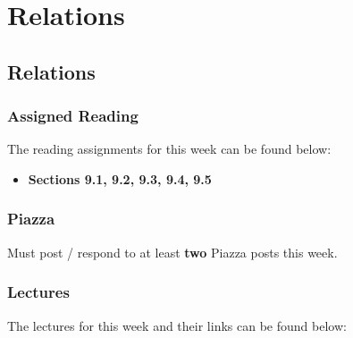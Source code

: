 \clearpage

\renewcommand{\ChapTitle}{Relations}
\renewcommand{\SectionTitle}{Relations}

\chapter{\ChapTitle}
\section{\SectionTitle}

\subsection{Assigned Reading}

The reading assignments for this week can be found below:

\begin{itemize}
    \item \textbf{Sections 9.1, 9.2, 9.3, 9.4, 9.5}
\end{itemize}

\subsection{Piazza}

Must post / respond to at least \textbf{two} Piazza posts this week.  

\subsection{Lectures}

The lectures for this week and their links can be found below:

